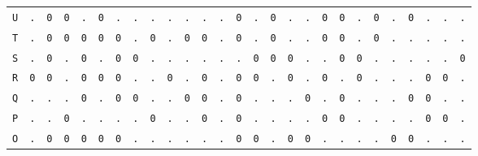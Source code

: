 \begin{figure}[H]
\begin{center}
{\begin{tabular}{c|cccccccccccccccccccccccccc}
				\texttt{U} & \texttt{.} & \texttt{0} & \texttt{0} & \texttt{.} & \texttt{0} & \texttt{.} & \texttt{.} & \texttt{.} & \texttt{.} & \texttt{.} & \texttt{.} & \texttt{.} & \texttt{0} & \texttt{.} & \texttt{0} & \texttt{.} & \texttt{.} & \texttt{0} & \texttt{0} & \texttt{.} & \texttt{0} & \texttt{.} & \texttt{0} & \texttt{.} & \texttt{.} & \texttt{.} \\
				\texttt{T} & \texttt{.} & \texttt{0} & \texttt{0} & \texttt{0} & \texttt{0} & \texttt{0} & \texttt{.} & \texttt{0} & \texttt{.} & \texttt{0} & \texttt{0} & \texttt{.} & \texttt{0} & \texttt{.} & \texttt{0} & \texttt{.} & \texttt{.} & \texttt{0} & \texttt{0} & \texttt{.} & \texttt{0} & \texttt{.} & \texttt{.} & \texttt{.} & \texttt{.} & \texttt{.} \\
				\texttt{S} & \texttt{.} & \texttt{0} & \texttt{.} & \texttt{0} & \texttt{.} & \texttt{0} & \texttt{0} & \texttt{.} & \texttt{.} & \texttt{.} & \texttt{.} & \texttt{.} & \texttt{.} & \texttt{0} & \texttt{0} & \texttt{0} & \texttt{.} & \texttt{.} & \texttt{0} & \texttt{0} & \texttt{.} & \texttt{.} & \texttt{.} & \texttt{.} & \texttt{.} & \texttt{0} \\
				\texttt{R} & \texttt{0} & \texttt{0} & \texttt{.} & \texttt{0} & \texttt{0} & \texttt{0} & \texttt{.} & \texttt{.} & \texttt{0} & \texttt{.} & \texttt{0} & \texttt{.} & \texttt{0} & \texttt{0} & \texttt{.} & \texttt{0} & \texttt{.} & \texttt{0} & \texttt{.} & \texttt{0} & \texttt{.} & \texttt{.} & \texttt{.} & \texttt{0} & \texttt{0} & \texttt{.} \\
				\texttt{Q} & \texttt{.} & \texttt{.} & \texttt{.} & \texttt{0} & \texttt{.} & \texttt{0} & \texttt{0} & \texttt{.} & \texttt{.} & \texttt{0} & \texttt{0} & \texttt{.} & \texttt{0} & \texttt{.} & \texttt{.} & \texttt{.} & \texttt{0} & \texttt{.} & \texttt{0} & \texttt{.} & \texttt{.} & \texttt{.} & \texttt{0} & \texttt{0} & \texttt{.} & \texttt{.} \\
				\texttt{P} & \texttt{.} & \texttt{.} & \texttt{0} & \texttt{.} & \texttt{.} & \texttt{.} & \texttt{.} & \texttt{0} & \texttt{.} & \texttt{.} & \texttt{0} & \texttt{.} & \texttt{0} & \texttt{.} & \texttt{.} & \texttt{.} & \texttt{.} & \texttt{0} & \texttt{0} & \texttt{.} & \texttt{.} & \texttt{.} & \texttt{.} & \texttt{0} & \texttt{0} & \texttt{.} \\
				\texttt{O} & \texttt{.} & \texttt{0} & \texttt{0} & \texttt{0} & \texttt{0} & \texttt{0} & \texttt{.} & \texttt{.} & \texttt{.} & \texttt{.} & \texttt{.} & \texttt{.} & \texttt{0} & \texttt{0} & \texttt{.} & \texttt{0} & \texttt{0} & \texttt{.} & \texttt{.} & \texttt{.} & \texttt{.} & \texttt{0} & \texttt{0} & \texttt{.} & \texttt{.} & \texttt{.} \\

\end{tabular}}
\end{center}
\end{figure}
